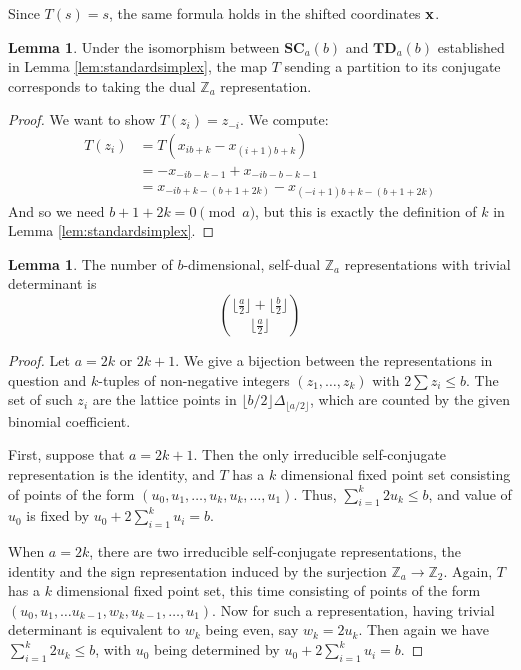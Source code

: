 \documentclass{amsart}[12pt]
\theoremstyle{definition}
\newtheorem{lemma}[dummy]{Lemma}
\newcommand{\Z}{\mathbb{Z}}
\newcommand{\SC}{\mathbf{SC}}
\newcommand{\TD}{\mathbf{TD}}
\begin{document}
Since $T(s)=s$, the same formula holds in the shifted coordinates $\bf{x}$. 



\begin{lemma} \label{lem:conjugatedual}
Under the isomorphism between $\SC_a(b)$ and $\TD_a(b)$ established in Lemma \ref{lem:standardsimplex}, the map $T$ sending a partition to its conjugate corresponds to taking the dual $\Z_a$ representation.
\end{lemma}

\begin{proof}
We want to show $T(z_i)=z_{-i}$.  We compute:
\begin{align*}
T(z_i)&=T(x_{ib+k}-x_{(i+1)b+k}) \\
&=-x_{-ib-k-1}+x_{-ib-b-k-1} \\
& =x_{-ib+k-(b+1+2k)}-x_{(-i+1)b+k-(b+1+2k)}
\end{align*}
And so we need $b+1+2k=0\pmod a$, but this is exactly the definition of $k$ in Lemma \ref{lem:standardsimplex}.
\end{proof}



\begin{lemma} \label{lem:conjugatecount}
The number of $b$-dimensional, self-dual $\Z_a$ representations with trivial determinant is $$\binom{\big\lfloor\frac{a}{2}\big\rfloor+\big\lfloor\frac{b}{2}\big\rfloor}{\big\lfloor\frac{a}{2}\big\rfloor}$$
\end{lemma}

\begin{proof}
  Let $a=2k$ or $2k+1$.  We give a bijection between the representations in question and $k$-tuples of non-negative integers $(z_1,\dots, z_k)$ with $2\sum z_i\leq b$.  The set of such $z_i$ are the lattice points in $\lfloor b/2\rfloor\Delta_{\lfloor a/2\rfloor}$, which are counted by the given binomial coefficient.

First, suppose that $a=2k+1$.  Then the only irreducible self-conjugate representation is the identity, and $T$ has a $k$ dimensional fixed point set consisting of points of the form $(u_0, u_1,\dots, u_k,u_k,\dots, u_1)$.  Thus, $\sum_{i=1}^k 2u_k\leq b$, and value of $u_0$ is fixed by $u_0+2\sum_{i=1}^k u_i=b$.

When $a=2k$, there are two irreducible self-conjugate representations, the identity and the sign representation induced by the surjection $\Z_a\to\Z_2$.  Again, $T$ has a $k$ dimensional fixed point set, this time consisting of points of the form $(u_0, u_1,\dots u_{k-1}, w_{k}, u_{k-1},\dots,u_1)$.  Now for such a representation, having trivial determinant is equivalent to $w_k$ being even, say $w_k=2u_k$.  Then again we have $\sum_{i=1}^k 2u_k\leq b$, with $u_0$ being determined by $u_0+2\sum_{i=1}^{k}u_i=b$. 
\end{proof}
\end{document}

